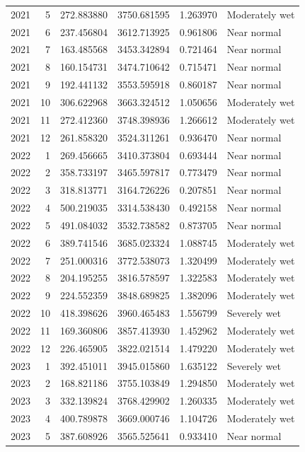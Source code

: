 \begin{tabular}{rrrrrl}
2021 & 5 & 272.883880 & 3750.681595 & 1.263970 & Moderately wet \\
2021 & 6 & 237.456804 & 3612.713925 & 0.961806 & Near normal \\
2021 & 7 & 163.485568 & 3453.342894 & 0.721464 & Near normal \\
2021 & 8 & 160.154731 & 3474.710642 & 0.715471 & Near normal \\
2021 & 9 & 192.441132 & 3553.595918 & 0.860187 & Near normal \\
2021 & 10 & 306.622968 & 3663.324512 & 1.050656 & Moderately wet \\
2021 & 11 & 272.412360 & 3748.398936 & 1.266612 & Moderately wet \\
2021 & 12 & 261.858320 & 3524.311261 & 0.936470 & Near normal \\
2022 & 1 & 269.456665 & 3410.373804 & 0.693444 & Near normal \\
2022 & 2 & 358.733197 & 3465.597817 & 0.773479 & Near normal \\
2022 & 3 & 318.813771 & 3164.726226 & 0.207851 & Near normal \\
2022 & 4 & 500.219035 & 3314.538430 & 0.492158 & Near normal \\
2022 & 5 & 491.084032 & 3532.738582 & 0.873705 & Near normal \\
2022 & 6 & 389.741546 & 3685.023324 & 1.088745 & Moderately wet \\
2022 & 7 & 251.000316 & 3772.538073 & 1.320499 & Moderately wet \\
2022 & 8 & 204.195255 & 3816.578597 & 1.322583 & Moderately wet \\
2022 & 9 & 224.552359 & 3848.689825 & 1.382096 & Moderately wet \\
2022 & 10 & 418.398626 & 3960.465483 & 1.556799 & Severely wet \\
2022 & 11 & 169.360806 & 3857.413930 & 1.452962 & Moderately wet \\
2022 & 12 & 226.465905 & 3822.021514 & 1.479220 & Moderately wet \\
2023 & 1 & 392.451011 & 3945.015860 & 1.635122 & Severely wet \\
2023 & 2 & 168.821186 & 3755.103849 & 1.294850 & Moderately wet \\
2023 & 3 & 332.139824 & 3768.429902 & 1.260335 & Moderately wet \\
2023 & 4 & 400.789878 & 3669.000746 & 1.104726 & Moderately wet \\
2023 & 5 & 387.608926 & 3565.525641 & 0.933410 & Near normal \\

\end{tabular}
